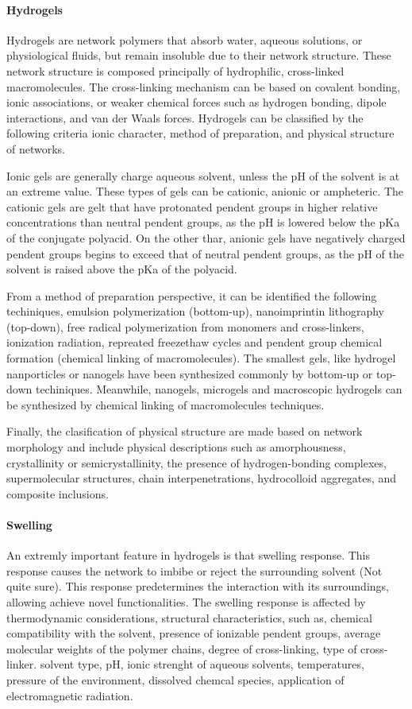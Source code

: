 \paragraph{Hydrogels}
Hydrogels are network polymers that absorb water, aqueous solutions, or physiological fluids, but remain insoluble due to their network structure.
These network structure is composed principally of hydrophilic, cross-linked macromolecules.
The cross-linking mechanism can be based on covalent bonding, ionic associations, or weaker chemical forces such as hydrogen bonding, dipole interactions, and van der Waals forces.
Hydrogels can be classified by the following criteria ionic character, method of preparation, and physical structure of networks.

Ionic gels are generally charge aqueous solvent, unless the pH of the solvent is at an extreme value.
These types of gels can be cationic, anionic or ampheteric.
The cationic gels are gelt that have protonated pendent groups in higher relative concentrations than neutral pendent groups, as the pH is lowered below the pKa of the conjugate polyacid.
On the other thar, anionic gels have negatively charged pendent groups begins to exceed that of neutral pendent groups, as the pH of the solvent is raised above the pKa of the polyacid.

From a method of preparation perspective, it can be identified the following techiniques,
        emulsion polymerization (bottom-up),
        nanoimprintin lithography (top-down),
        free radical polymerization from monomers and cross-linkers, ionization radiation, repreated freezethaw cycles and pendent group chemical formation (chemical linking of macromolecules).
The smallest gels, like hydrogel nanporticles or nanogels have been synthesized commonly by bottom-up or top-down techiniques.
Meanwhile, nanogels, microgels and macroscopic hydrogels can be synthesized by chemical linking of macromolecules techniques.

Finally, the clasification of physical structure are made based on network morphology and include physical descriptions such as amorphousness, crystallinity or semicrystallinity, the presence of hydrogen-bonding complexes, supermolecular structures, chain interpenetrations, hydrocolloid aggregates, and composite inclusions.


\paragraph{Swelling}
An extremly important feature in hydrogels is that swelling response.
This response causes the network to imbibe or reject the surrounding solvent (Not quite sure).
This response predetermines the interaction with its surroundings, allowing achieve novel functionalities.
The swelling response is affected by 
    thermodynamic considerations, 
    structural characteristics, such as, chemical compatibility with the solvent,
    presence of ionizable pendent groups,
    average molecular weights of the polymer chains,
    degree of cross-linking,
    type of cross-linker.
    solvent type,
    pH,
    ionic strenght of aqueous solvents,
    temperatures,
    pressure of the environment,
    dissolved chemcal species,
    application of electromagnetic radiation.

